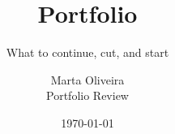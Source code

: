 \documentclass[aspectratio=169,11pt]{beamer}
\title{Portfolio}
\subtitle{What to continue, cut, and start}
\author{Marta Oliveira \\ \small Portfolio Review}
\date{\today}
\begin{document}
\titleslide






\end{document}
